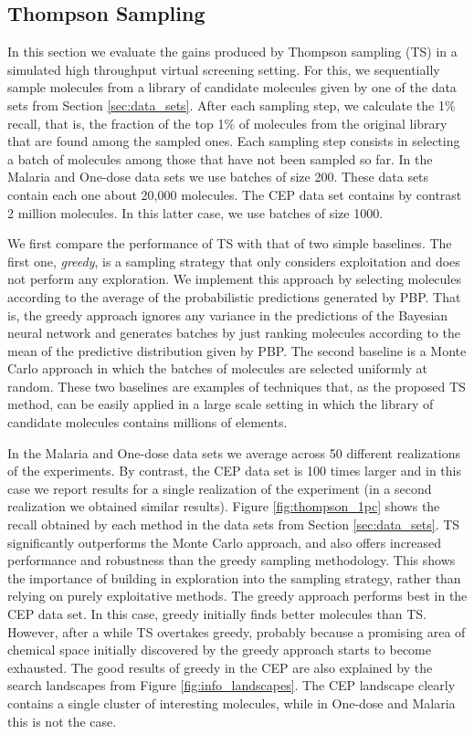 \subsection{Thompson Sampling}

In this section we evaluate the gains produced by Thompson sampling (TS) in a simulated high throughput virtual screening setting. For this, we sequentially sample molecules from a library of candidate molecules given by one of the data sets from Section \ref{sec:data_sets}. After each sampling step, we calculate the 1\% recall, that is, the fraction of the top 1\% of molecules from the original library that are found among the sampled ones. Each sampling step consists in selecting a batch of molecules among those that have not been sampled so far. In the Malaria and One-dose data sets we use batches of size 200. These data sets contain each one about 20,000 molecules. The CEP data set contains by contrast 2 million molecules. In this latter case, we use batches of size 1000. 

We first compare the performance of TS with that of two simple baselines. The first one, \emph{greedy}, is a sampling strategy that only considers exploitation and does not perform any exploration. We implement this approach by selecting molecules according to the average of the probabilistic predictions generated by PBP. That is, the greedy approach ignores any variance in the predictions of the Bayesian neural network and generates batches by just ranking molecules according to the mean of the predictive distribution given by PBP. The second baseline is a Monte Carlo approach in which the batches of molecules are selected uniformly at random. These two baselines are examples of techniques that, as the proposed TS method, can be easily applied in a large scale setting in which the library of candidate molecules contains millions of elements.

In the Malaria and One-dose data sets we average across 50 different realizations of the experiments. By contrast, the CEP data set is 100 times larger and in this case we report results for a single realization of the experiment (in a second realization we obtained similar results). 
Figure \ref{fig:thompson_1pc} shows the recall obtained by each method in the data sets from 
Section \ref{sec:data_sets}. TS significantly outperforms the Monte Carlo approach, and also offers increased performance and robustness than the greedy sampling methodology. This shows the importance of building in exploration into the sampling strategy, rather than relying on purely exploitative methods. The greedy approach performs best in the CEP data set. In this case, greedy initially finds better molecules than TS. However, after a while TS overtakes greedy, probably because a promising area of chemical space 
initially discovered by the greedy approach starts to become exhausted. The good results of greedy in the CEP are also explained by the search landscapes from Figure \ref{fig:info_landscapes}. The CEP landscape clearly contains a single cluster of interesting molecules, while in One-dose and Malaria this is not the case.

